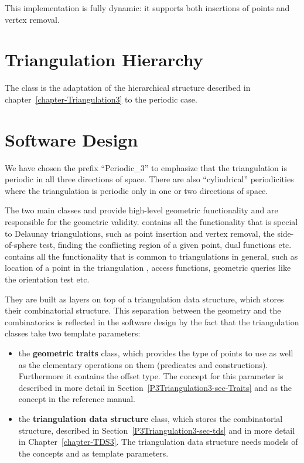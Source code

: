 This implementation is fully dynamic: it supports both insertions of
points and vertex removal.

\section{Triangulation Hierarchy}
The class  is the adaptation
of the hierarchical structure described in
chapter~\ref{chapter-Triangulation3} to the periodic case.

\section{Software Design\label{P3Triangulation3-sec-design}}
We have chosen the prefix ``Periodic\_3'' to emphasize that the
triangulation is periodic in all three directions of space. There are
also ``cylindrical'' periodicities where the triangulation is periodic
only in one or two directions of space.

The two main classes  and
 provide high-level geometric
functionality and are responsible for the geometric validity.
 contains all the
functionality that is special to Delaunay triangulations, such as
point insertion and vertex removal, the side-of-sphere test, finding
the conflicting region of a given point, dual functions etc.
 contains all the functionality
that is common to triangulations in general, such as location of a
point in the triangulation \cite{cgal:dpt-wt-02}, access functions,
geometric queries like the orientation test etc.

They are built as layers on top of a triangulation data structure,
which stores their combinatorial structure. This separation between
the geometry and the combinatorics is reflected in the software design
by the fact that the triangulation classes take two template
parameters: 
\begin{itemize}
\item {} the \textbf{geometric traits} class, which provides the type of points
to use as well as the elementary operations on them (predicates and
constructions). Furthermore it contains the offset type.
The concept for this parameter is described in more
detail in Section~\ref{P3Triangulation3-sec-Traits}
and as the concept  in
the reference
manual.
\item {} the \textbf{triangulation data structure} class, which stores the
combinatorial structure, described in
Section~\ref{P3Triangulation3-sec-tds} and in more detail in
Chapter~\ref{chapter-TDS3}. The triangulation data structure needs
models of the concepts  and
 as template parameters. 
\end{itemize}

